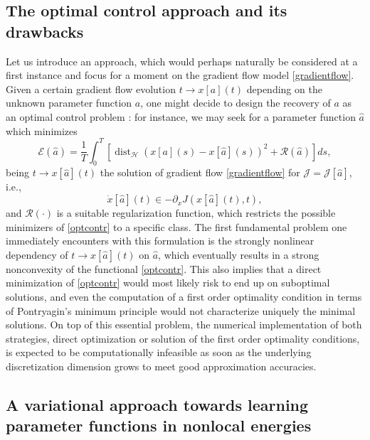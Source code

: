 \subsection{The optimal control approach and its drawbacks}
Let us introduce an approach, which would perhaps naturally be considered at a first instance and focus for a moment on the gradient flow model \eqref{gradientflow}. Given a certain gradient flow evolution $t \to x[a](t)$ depending on the unknown parameter function $a$, one might decide to design the recovery of $a$ as an optimal control problem \cite{brpi07}: for instance, we may seek for a parameter function $\widehat a$ which minimizes
\begin{equation}\label{optcontr}
\mathcal E(\widehat a) = \frac{1}{T}\int_0^T \left [ \operatorname{dist}_{\mathcal H}(x[a](s) - x[\widehat a](s))^2 + \mathcal R(\widehat a) \right ] d s ,
\end{equation}
being $t \to x[\widehat a](t)$ the solution of gradient flow \eqref{gradientflow} for $\mathcal J = \mathcal J[\widehat a]$, i.e.,
\begin{equation}\label{gradientflow2}
\dot x[\widehat a](t) \in - \partial_x J(x[\widehat a](t),t),
\end{equation}
and $\mathcal R(\cdot)$ is a suitable regularization function, which restricts the possible minimizers of \eqref{optcontr} to a specific class. The first fundamental problem one immediately encounters with this formulation is the strongly nonlinear dependency of $t \to x[\widehat a](t)$ on $\widehat a$, which eventually results in a strong nonconvexity of the functional \eqref{optcontr}. This also implies that a direct minimization of \eqref{optcontr} would most likely risk to end up on suboptimal solutions, and even the computation of a first order optimality condition in terms of Pontryagin's minimum principle would not characterize uniquely the minimal solutions. On top of this essential problem, the numerical implementation of both strategies, direct optimization or solution of the first order optimality conditions, is expected to be computationally infeasible as soon as the underlying discretization dimension grows to meet good approximation accuracies.

\subsection{A variational approach towards learning parameter functions in nonlocal energies}\label{sec:wp2}

